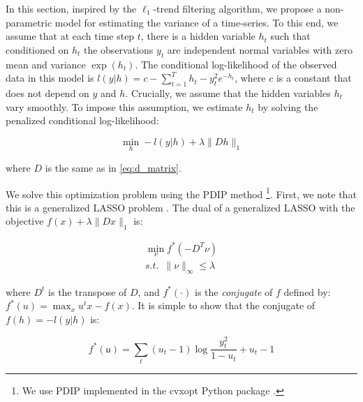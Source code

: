 \documentclass[review]{elsarticle}
\begin{document}


In this section, inspired by the $\ell_1$-trend filtering algorithm, we propose a non-parametric model for estimating the variance of a time-series. To this end, we assume that at each time step $t$, there is a hidden variable $h_t$ such that conditioned on $h_t$ the observations $y_t$ are independent normal variables with zero mean and variance $\exp(h_t)$. The conditional log-likelihood of the observed data in this model is $l(y|h)=c-\sum_{t=1}^Th_t-y_t^2e^{-h_t}$, where $c$ is a constant that does not depend on $y$ and $h$. Crucially, we assume that the hidden variables $h_t$ vary smoothly. To impose this assumption, we estimate $h_t$ by solving the penalized conditional log-likelihood:

\begin{equation}
\min_h -l(y|h)+\lambda \lVert Dh \lVert_1
\label{eq:l1tf_var}
\end{equation}

\noindent where $D$ is the same as in \ref{eq:d_matrix}.


We solve this optimization problem using the PDIP method \footnote{We use PDIP implemented in the cvxopt Python package \cite{andersen_cvxopt:_2013}.}. First, we note that this is a generalized LASSO problem \cite{tibshirani_solution_2011}. The dual of a generalized LASSO with the objective $f(x)+\lambda \lVert Dx \lVert_1$ is:

\begin{equation}
\begin{aligned}
\min_\nu f^*(-D^T\mathsf{\nu}) \\
s.t. \,\,\, \lVert \mathsf{\nu} \lVert_\infty \le \lambda
\end{aligned}
\end{equation}

\noindent where $D^t$ is the transpose of $D$, and $f^*(\cdot)$ is the \textit{conjugate} of $f$ defined by: $f^*(u)=\max_x u^tx-f(x)$. It is simple to show that the conjugate of $f(h)=-l(y|h)$ is:

\begin{equation}
f^*(\mathsf{u})=\sum_t (u_t-1)\log\frac{y_t^2}{1-u_t} + u_t-1
\label{eq:conj}
\end{equation}
\end{document}
